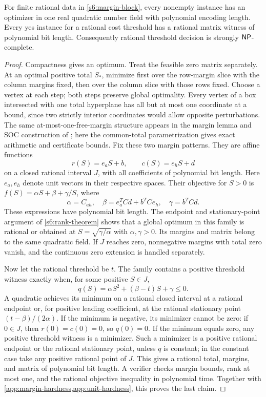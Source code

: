 \begin{theorem}
\label{app:margin-certificates}
For finite rational data in \eqref{s6:margin-block}, every nonempty
instance has an optimizer in one real quadratic number field with
polynomial encoding length. Every yes instance for a rational cost
threshold has a rational matrix witness of polynomial bit length.
Consequently rational threshold decision is strongly $\mathsf{NP}$-complete.
\end{theorem}
\begin{proof}
Compactness gives an optimum. Treat the feasible zero matrix separately.
At an optimal positive total $S_*$, minimize first over the row-margin
slice with the column margins fixed, then over the column slice with
those rows fixed. Choose a vertex at each step; both steps preserve
global optimality. Every vertex of a box intersected with one total
hyperplane has all but at most one coordinate at a bound, since two strictly
interior coordinates would allow opposite perturbations. The same
at-most-one-free-margin structure appears in the margin lemma and SOC
construction of \citet[Lemma~1 and the proof of Theorem~2]{s6:jalilian2026}; here the
common-total parametrization gives exact arithmetic and certificate bounds.
Fix these two margin patterns. They are affine functions
\[
 r(S)=e_aS+b,\qquad c(S)=e_hS+d
\]
on a closed rational interval $J$, with all coefficients of polynomial
bit length. Here $e_a,e_h$ denote unit vectors in their respective spaces.
Their objective for $S>0$ is
$f(S)=\alpha S+\beta+\gamma/S$, where
\[
 \alpha=C_{ah},\quad
 \beta=e_a^TCd+b^TCe_h,\quad \gamma=b^TCd.
\]
These expressions have polynomial bit length. The endpoint and
stationary-point argument of \cref{s6:rank-theorem} shows that a global
optimum in this family is rational or obtained at
$S=\sqrt{\gamma/\alpha}$ with $\alpha,\gamma>0$. Its margins and
matrix belong to the same quadratic field. If $J$ reaches zero,
nonnegative margins with total zero vanish, and the continuous
zero extension is handled separately.

Now let the rational threshold be $t$. The family contains a positive
threshold witness exactly when, for some positive $S\in J$,
\[
 q(S)=\alpha S^2+(\beta-t)S+\gamma\le0.
\]
A quadratic achieves its minimum on a rational closed interval at a
rational endpoint or, for positive leading coefficient, at the rational
stationary point $(t-\beta)/(2\alpha)$. If the minimum is negative,
its minimizer cannot be zero: if $0\in J$, then $r(0)=c(0)=0$, so
$q(0)=0$. If the minimum equals zero, any positive threshold witness is
a minimizer. Such a minimizer is a positive rational endpoint or the
rational stationary point, unless $q$ is constant; in the constant case
take any positive rational point of $J$. This gives a rational total,
margins, and matrix of polynomial bit length.
A verifier checks margin bounds, rank at most one, and the rational
objective inequality in polynomial time. Together with
\cref{app:margin-hardness,app:unit-hardness}, this proves the last claim.
\end{proof}

